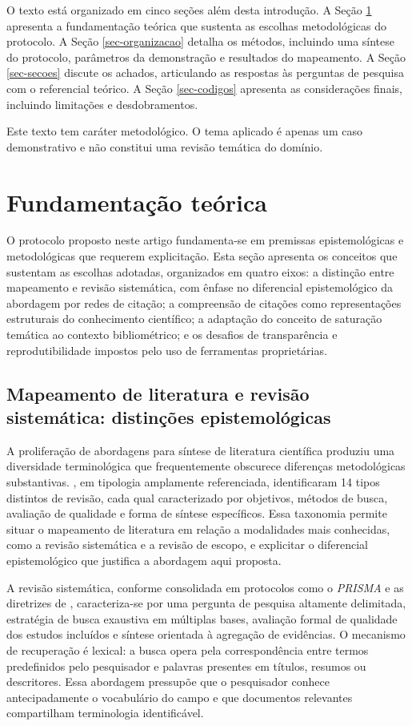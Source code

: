\documentclass[portuguese]{textolivre}
\begin{document}
	O texto está organizado em cinco seções além desta introdução. A Seção \ref{sec-normas} apresenta a fundamentação teórica que sustenta as escolhas metodológicas do protocolo. A Seção \ref{sec-organizacao} detalha os métodos, incluindo uma síntese do protocolo, parâmetros da demonstração e resultados do mapeamento. A Seção \ref{sec-secoes} discute os achados, articulando as respostas às perguntas de pesquisa com o referencial teórico. A Seção \ref{sec-codigos} apresenta as considerações finais, incluindo limitações e desdobramentos.
    
	Este texto tem caráter metodológico. O tema aplicado é apenas um caso demonstrativo e não constitui uma revisão temática do domínio.

\section{Fundamentação teórica}\label{sec-normas}
O protocolo proposto neste artigo fundamenta-se em premissas epistemológicas e metodológicas que requerem explicitação. Esta seção apresenta os conceitos que sustentam as escolhas adotadas, organizados em quatro eixos: a distinção entre mapeamento e revisão sistemática, com ênfase no diferencial epistemológico da abordagem por redes de citação; a compreensão de citações como representações estruturais do conhecimento científico; a adaptação do conceito de saturação temática ao contexto bibliométrico; e os desafios de transparência e reprodutibilidade impostos pelo uso de ferramentas proprietárias.

\subsection{Mapeamento de literatura e revisão sistemática: distinções epistemológicas}\label{sec-conduta}
A proliferação de abordagens para síntese de literatura científica produziu uma diversidade terminológica que frequentemente obscurece diferenças metodológicas substantivas. \textcite{Grant2009}, em tipologia amplamente referenciada, identificaram 14 tipos distintos de revisão, cada qual caracterizado por objetivos, métodos de busca, avaliação de qualidade e forma de síntese específicos. Essa taxonomia permite situar o mapeamento de literatura em relação a modalidades mais conhecidas, como a revisão sistemática e a revisão de escopo, e explicitar o diferencial epistemológico que justifica a abordagem aqui proposta.

	A revisão sistemática, conforme consolidada em protocolos como o \textit{PRISMA} \cite{Page2021} e as diretrizes de \textcite{Kitchenham2007}, caracteriza-se por uma pergunta de pesquisa altamente delimitada, estratégia de busca exaustiva em múltiplas bases, avaliação formal de qualidade dos estudos incluídos e síntese orientada à agregação de evidências. O mecanismo de recuperação é lexical: a busca opera pela correspondência entre termos predefinidos pelo pesquisador e palavras presentes em títulos, resumos ou descritores. Essa abordagem pressupõe que o pesquisador conhece antecipadamente o vocabulário do campo e que documentos relevantes compartilham terminologia identificável.
    
\end{document}
